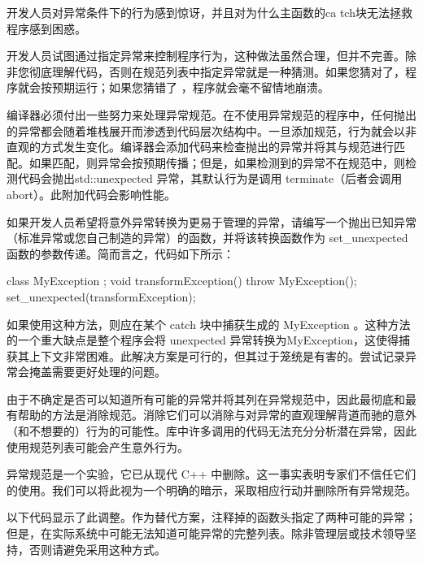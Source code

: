 开发人员对异常条件下的行为感到惊讶，并且对为什么主函数的ca tch块无法拯救程序感到困惑。


开发人员试图通过指定异常来控制程序行为，这种做法虽然合理，但并不完善。除非您彻底理解代码，否则在规范列表中指定异常就是一种猜测。如果您猜对了，程序就会按预期运行；如果您猜错了 ，程序就会毫不留情地崩溃。

编译器必须付出一些努力来处理异常规范。在不使用异常规范的程序中，任何抛出的异常都会随着堆栈展开而渗透到代码层次结构中。一旦添加规范，行为就会以非直观的方式发生变化。编译器会添加代码来检查抛出的异常并将其与规范进行匹配。如果匹配，则异常会按预期传播；但是，如果检测到的异常不在规范中，则检测代码会抛出std::unexpected 异常，其默认行为是调用 terminate（后者会调用 abort）。此附加代码会影响性能。

如果开发人员希望将意外异常转换为更易于管理的异常，请编写一个抛出已知异常（标准异常或您自己制造的异常）的函数，并将该转换函数作为 set\_unexpected 函数的参数传递。简而言之，代码如下所示：

\begin{cpp}
class MyException {};
void transformException() { throw MyException(); }
set_unexpected(transformException);
\end{cpp}

如果使用这种方法，则应在某个 catch 块中捕获生成的 MyException 。这种方法的一个重大缺点是整个程序会将 unexpected 异常转换为MyException，这使得捕获其上下文非常困难。此解决方案是可行的，但其过于笼统是有害的。尝试记录异常会掩盖需要更好处理的问题。


由于不确定是否可以知道所有可能的异常并将其列在异常规范中，因此最彻底和最有帮助的方法是消除规范。消除它们可以消除与对异常的直观理解背道而驰的意外（和不想要的）行为的可能性。库中许多调用的代码无法充分分析潜在异常，因此使用规范列表可能会产生意外行为。

异常规范是一个实验，它已从现代 C++ 中删除。这一事实表明专家们不信任它们的使用。我们可以将此视为一个明确的暗示，采取相应行动并删除所有异常规范。

以下代码显示了此调整。作为替代方案，注释掉的函数头指定了两种可能的异常；但是，在实际系统中可能无法知道可能异常的完整列表。除非管理层或技术领导坚持，否则请避免采用这种方式。


